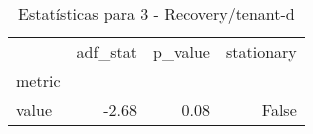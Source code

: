 \begin{table}[htbp]
\caption{Estatísticas para 3 - Recovery/tenant-d}
\label{tab:3_-_recovery_tenant-d_adf_test}
\begin{tabular}{lrrr}
\toprule
 & adf_stat & p_value & stationary \\
metric &  &  &  \\
\midrule
value & -2.68 & 0.08 & False \\
\bottomrule
\end{tabular}
\end{table}

